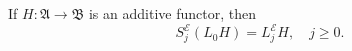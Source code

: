 If $H : \mathfrak{A} \to \mathfrak{B}$ is an additive functor, then
$$S_j^{\mathcal{E}}(L_0 H) = L_j^{\mathcal{E}} H, \quad j \geq 0.$$